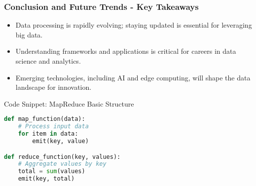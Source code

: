 \documentclass[aspectratio=169]{beamer}
\begin{document}
\begin{frame}[fragile]
    \frametitle{Conclusion and Future Trends - Key Takeaways}
    \begin{itemize}
        \item Data processing is rapidly evolving; staying updated is essential for leveraging big data.
        \item Understanding frameworks and applications is critical for careers in data science and analytics.
        \item Emerging technologies, including AI and edge computing, will shape the data landscape for innovation.
    \end{itemize}
    
    \begin{block}{Code Snippet: MapReduce Basic Structure}
        \begin{lstlisting}[language=python]
def map_function(data):
    # Process input data 
    for item in data:
        emit(key, value)

def reduce_function(key, values):
    # Aggregate values by key
    total = sum(values)
    emit(key, total)
        \end{lstlisting}
    \end{block}
\end{frame}
\end{document}
